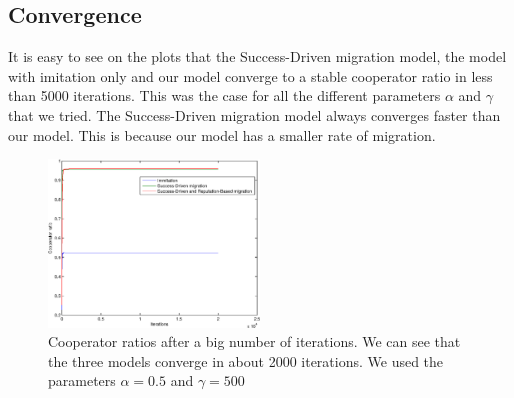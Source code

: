 \documentclass[11pt]{article}
\begin{document}
\subsection{Convergence}
It is easy to see on the plots that the Success-Driven migration model, the model with imitation only and our model converge to a stable cooperator ratio in less than 5000 iterations. This was the case for all the different parameters $\alpha$ and $\gamma$ that we tried.
The Success-Driven migration model always converges faster than our model. This is because our model has a smaller rate of migration.
\begin{figure}
	\centering
        \includegraphics[width=0.5\textwidth]{../../other/plots/convergence-20000.eps}
	\caption{Cooperator ratios after a big number of iterations. We can see that the three models converge in about 2000 iterations. We used the parameters $\alpha = 0.5$ and $\gamma = 500$}
\end{figure}
\end{document}
